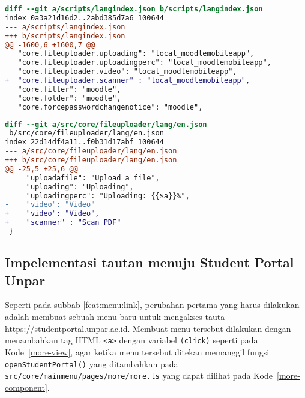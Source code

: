 \begin{lstlisting}[language=diff, frame=single, label ={langindex.json}, caption = Perubahan pada file \texttt{langindex.json} ]
diff --git a/scripts/langindex.json b/scripts/langindex.json
index 0a3a21d16d2..2abd385d7a6 100644
--- a/scripts/langindex.json
+++ b/scripts/langindex.json
@@ -1600,6 +1600,7 @@
   "core.fileuploader.uploading": "local_moodlemobileapp",
   "core.fileuploader.uploadingperc": "local_moodlemobileapp",
   "core.fileuploader.video": "local_moodlemobileapp",
+  "core.fileuploader.scanner" : "local_moodlemobileapp",
   "core.filter": "moodle",
   "core.folder": "moodle",
   "core.forcepasswordchangenotice": "moodle",
\end{lstlisting} 

\begin{lstlisting}[language=diff, frame=single, label ={fileuploader-lang-eng}, caption = Perubahan pada file \texttt{src/core/fileuploader/lang/en.json} ]
diff --git a/src/core/fileuploader/lang/en.json
 b/src/core/fileuploader/lang/en.json
index 22d14df4a11..f0b31d17abf 100644
--- a/src/core/fileuploader/lang/en.json
+++ b/src/core/fileuploader/lang/en.json
@@ -25,5 +25,6 @@
     "uploadafile": "Upload a file",
     "uploading": "Uploading",
     "uploadingperc": "Uploading: {{$a}}%",
-    "video": "Video"
+    "video": "Video",
+    "scanner" : "Scan PDF"
 }
\end{lstlisting} 

\subsection{Impelementasi tautan menuju Student Portal Unpar}
Seperti pada subbab \ref{feat:menu:link}, perubahan pertama yang harus dilakukan adalah membuat sebuah menu baru untuk mengakses tauta \url{https://studentportal.unpar.ac.id}. Membuat menu tersebut dilakukan dengan menambahkan tag HTML \texttt{<a>} dengan variabel \texttt{(click)} seperti pada \mbox{Kode \ref{more-view}}, agar ketika menu tersebut ditekan memanggil fungsi \texttt{openStudentPortal()} yang ditambahkan pada \texttt{src/core/mainmenu/pages/more/more.ts} yang dapat dilihat pada \mbox{Kode \ref{more-component}}.

